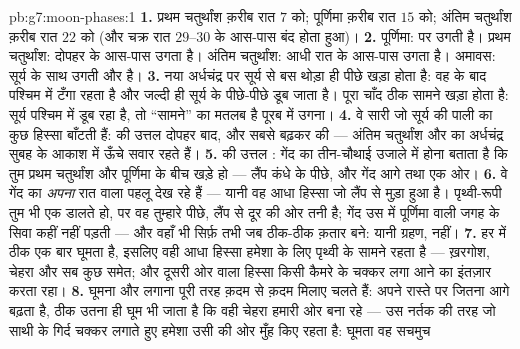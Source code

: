 \begin{solution}{pb:g7:moon-phases:1}
\textbf{1.} प्रथम चतुर्थांश क़रीब रात $7$ को; पूर्णिमा क़रीब रात $15$
को; अंतिम चतुर्थांश क़रीब रात $22$ को (और चक्र रात $29$--$30$ के
आस-पास बंद होता हुआ)।
\textbf{2.} पूर्णिमा:  पर उगती है। प्रथम चतुर्थांश: दोपहर के
आस-पास उगता है। अंतिम चतुर्थांश: आधी रात के आस-पास उगता है। अमावस:
सूर्य के साथ उगती और  है।
\textbf{3.} नया अर्धचंद्र  पर सूर्य से बस थोड़ा ही पीछे खड़ा
होता है: वह  के बाद पश्चिम में टँगा रहता है और जल्दी ही
सूर्य के पीछे-पीछे डूब जाता है। पूरा चाँद ठीक सामने खड़ा होता है:
सूर्य पश्चिम में डूब रहा है, तो ``सामने'' का मतलब है पूरब में उगना।
\textbf{4.} वे सारी  जो सूर्य की पाली का कुछ हिस्सा बाँटती हैं:
 की उत्तल  दोपहर बाद, और सबसे बढ़कर  की 
--- अंतिम चतुर्थांश और  का अर्धचंद्र सुबह के आकाश में ऊँचे
सवार रहते हैं।
\textbf{5.}  की उत्तल : गेंद का तीन-चौथाई उजाले में होना
बताता है कि तुम प्रथम चतुर्थांश और पूर्णिमा के बीच खड़े हो --- लैंप
कंधे के पीछे, और गेंद आगे तथा एक ओर।
\textbf{6.} वे गेंद का \emph{अपना} रात वाला पहलू देख रहे हैं ---
यानी वह आधा हिस्सा जो लैंप से मुड़ा हुआ है। पृथ्वी-रूपी तुम भी एक
 डालते हो, पर वह तुम्हारे पीछे, लैंप से दूर की ओर तनी है; गेंद उस
 में पूर्णिमा वाली जगह के सिवा कहीं नहीं पड़ती --- और वहाँ भी
सिर्फ़ तभी जब ठीक-ठीक क़तार बने: यानी ग्रहण,  नहीं।
\textbf{7.}  हर  में ठीक एक बार घूमता है, इसलिए वही आधा
हिस्सा हमेशा के लिए पृथ्वी के सामने रहता है --- ख़रगोश, चेहरा और सब
कुछ समेत; और दूसरी ओर वाला हिस्सा किसी कैमरे के चक्कर लगा आने का
इंतज़ार करता रहा।
\textbf{8.} घूमना और  लगाना पूरी तरह क़दम से क़दम मिलाए चलते
हैं:  अपने रास्ते पर जितना आगे बढ़ता है, ठीक उतना ही घूम भी
जाता है कि वही चेहरा हमारी ओर बना रहे --- उस नर्तक की तरह जो साथी के
गिर्द चक्कर लगाते हुए हमेशा उसी की ओर मुँह किए रहता है: घूमता वह सचमुच

\end{solution}
